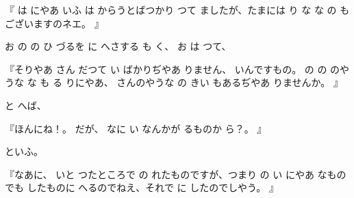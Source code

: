 
『
は
にやあ
いふ
は
からうとばつかり
つて
ましたが、たまには
り
な
な
の
もございますのネエ。
』

お
の
の
ひ
づるを
に
へさする
も
く、
お
は
つて、

『そりやあ
さん
だつて
い
ばかりぢやあ
りません、
いんですもの。
の
の
のやうな
な
も
る
りにやあ、
さんのやうな
の
きい
もあるぢやあ
りませんか。
』

と
へば、

『ほんにね！。
だが、
なに
い
なんかが
るものか
ら？。
』

といふ。

『なあに、
いと
つたところで
の
れたものですが、つまり
の
い
にやあ
なものでも
したものに
へるのでねえ、それで
に
したのでしやう。
』

